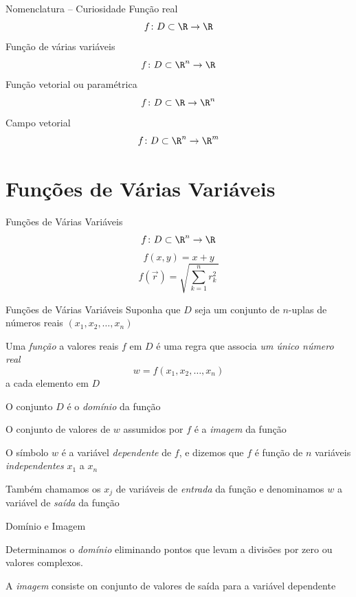 \documentclass[fleqn,utf8,aspectratio=169,12pt]{beamer}
\begin{document}
\begin{frame}{Nomenclatura -- Curiosidade}
  Função real
  \[
    f\colon D \subset \R \to \R
  \]
  \pause
  Função de várias variáveis
  \[
    f\colon D \subset \R^n \to \R
  \]
  \pause
  Função vetorial ou paramétrica
  \[
    f\colon D \subset \R \to \R^n
  \]
  \pause
  Campo vetorial
  \[
    f\colon D \subset \R^n \to \R^m
  \]
\end{frame}

\section{Funções de Várias Variáveis}

\begin{frame}{Funções de Várias Variáveis}
  \[
    f\colon D \subset \R^n \to \R
  \]
  \pause
  \[
    f(x, y) = x + y
  \]
  \pause
  \[
    f(\vec{r}) = \sqrt{\sum_{k=1}^n r_k^2\,}
  \]
\end{frame}

\begin{frame}{Funções de Várias Variáveis}
  Suponha que $D$ seja um conjunto  de $n$-uplas de números reais
  \((x_1, x_2, \dots, x_n)\)

  \pause
  Uma \emph{função} a valores reais $f$ em $D$ é uma regra que associa
  \emph{um único número real}
  \[
    w = f(x_1, x_2, \dots, x_n)
  \]
  a cada elemento em $D$

  \pause
  O conjunto $D$ é o \emph{domínio} da função

  \pause
  O conjunto de valores de $w$ assumidos por $f$ é a \emph{imagem} da função

  \pause
  O símbolo $w$ é a variável \emph{dependente} de $f$, e dizemos que $f$
  é função de $n$ variáveis \emph{independentes} $x_1$ a $x_n$

  \pause
  Também chamamos os $x_j$ de variáveis de \emph{entrada} da função e
  denominamos $w$ a variável de \emph{saída} da função
\end{frame}

\begin{frame}{Domínio e Imagem}

  Determinamos o \emph{domínio} eliminando pontos que
  levam a divisões por zero ou valores complexos.

  \pause
  \bigskip

  A \emph{imagem} consiste on conjunto de valores de saída
  para a variável dependente
\end{frame}
\end{document}
